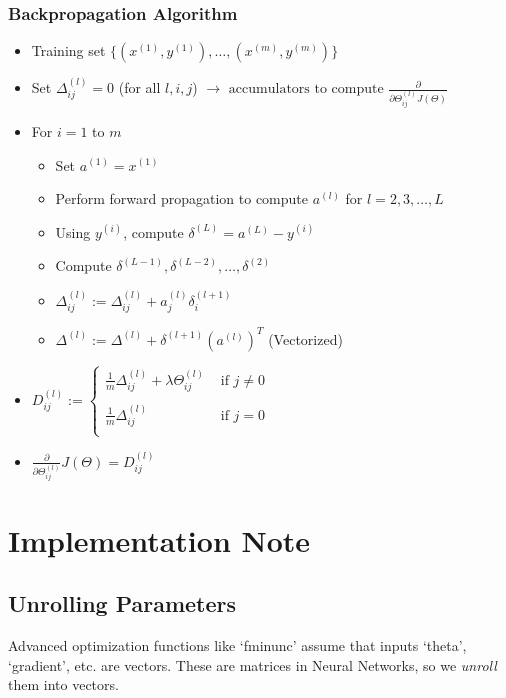 \subsubsection*{Backpropagation Algorithm}
\begin{itemize}[label={}]
	\item Training set $\displaystyle \{(x^{(1)}, y^{(1)}), \dots, (x^{(m)}, y^{(m)})\}$
	\item Set $\displaystyle \Delta_{ij}^{(l)} = 0$ (for all $l, i, j$)
	      $\rightarrow \text{ accumulators to compute }
		      \frac{\partial}{\partial\Theta_{ij}^{(l)}J(\Theta)}$
	\item For $i = 1$ to $m$
	      \begin{itemize}[label={}]
		      \item Set $a^{(1)} = x^{(1)}$
		      \item Perform forward propagation to compute $a^{(l)}$ for $l = 2, 3, \dots, L$
		      \item Using $y^{(i)}$, compute $\delta^{(L)} = a^{(L)} - y^{(i)}$
		      \item Compute $\delta^{(L-1)}, \delta^{(L-2)}, \dots, \delta^{(2)}$
		      \item $\Delta_{ij}^{(l)} := \Delta_{ij}^{(l)} + a_j^{(l)}\delta_i^{(l+1)}$
		      \item $\Delta^{(l)} := \Delta^{(l)} + \delta^{(l+1)}(a^{(l)})^T$ (Vectorized)
	      \end{itemize}
	\item $D_{ij}^{(l)} := \begin{cases}
			      \frac{1}{m}\Delta_{ij}^{(l)} +
			      \lambda \Theta_{ij}^{(l)}    & \text{ if } j \neq 0 \\
			      \\
			      \frac{1}{m}\Delta_{ij}^{(l)} & \text{ if } j = 0    \\
		      \end{cases}$
	\item $\frac{\partial}{\partial\Theta_{ij}^{(l)}}J(\Theta) = D_{ij}^{(l)}$
\end{itemize}

\section{Implementation Note}
\subsection{Unrolling Parameters}
Advanced optimization functions like `fminunc' assume that inputs `theta', `gradient', etc. are
vectors. These are matrices in Neural Networks, so we \emph{unroll} them into vectors.

